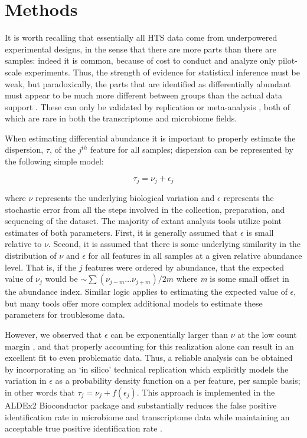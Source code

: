 \documentclass[10pt]{article}
\begin{document}
\section{Methods}\vskip-0.25cm

It is worth recalling that essentially all HTS data come from underpowered experimental designs, in the sense that there are more parts than there are samples: indeed it is common, because of cost to conduct and analyze only pilot-scale experiments. Thus, the strength of evidence for statistical inference must be weak, but paradoxically, the parts that are identified as differentially abundant must appear to be much more different between groups than the actual data support  . These can only be validated by replication or meta-analysis , both of which are rare in both the transcriptome and microbiome fields. 

When estimating differential abundance it is important to properly estimate the dispersion, $\tau$, of the $j^{th}$ feature for all samples; dispersion can be represented by the following simple model:

\begin{equation}
    \tau_{j} = \nu_j + \epsilon_j
\label{eq:dispersion}
\end{equation} 

where $\nu$ represents the underlying biological variation and $\epsilon$ represents the stochastic error  from all the steps involved in the collection, preparation, and sequencing of the dataset. The majority of extant analysis tools utilize point estimates of both parameters. First, it is generally assumed that  $\epsilon$ is small relative to $\nu$.  Second, it is assumed that there is some underlying similarity in the distribution of $\nu$ and $\epsilon$  for all features in all samples at a given relative abundance level. That is, if the $j$ features were ordered by abundance, that the expected value of $\nu_j$ would be  $\sim \sum (\nu_{j-m}\ldots \nu_{j+m}) / 2m $ where \textit{m} is some small offset in the abundance index. Similar logic applies to estimating the expected value of $\epsilon$, but many tools offer  more complex additional models to estimate these parameters for troublesome data. 

However, we  observed that $\epsilon$ can be exponentially larger than $\nu$ at the low count margin , and that properly accounting for this realization alone can result in an excellent fit to even problematic data. Thus, a reliable analysis can be obtained by incorporating an `in silico' technical replication which explicitly models the variation in $\epsilon$ as a probability density function on a per feature, per sample basis; in other words that $\tau_{j} = \nu_j + f(\epsilon_{j})$. This approach is implemented in the ALDEx2 Bioconductor package and substantially reduces the false positive identification rate in microbiome and transcriptome data while maintaining an acceptable true positive identification rate .
\end{document}

